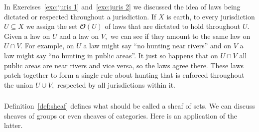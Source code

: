 \documentclass[../main/CT4S-EN-RU]{subfiles}
\begin{document}
\begin{applicationRUS}
\end{applicationRUS}

\begin{exampleENG}
In Exercises~\ref{exc:juris 1} and~\ref{exc:juris 2} we discussed the idea of laws being dictated or respected throughout a jurisdiction. If $X$ is earth, to every jurisdiction $U\subseteq X$ we assign the set ${𝓞}(U)$ of laws that are dictated to hold throughout $U.$ Given a law on $U$ and a law on $V,$ we can see if they amount to the same law on $U\cap V.$ For example, on $U$ a law  might say “no hunting near rivers” and on $V$ a law might say “no hunting in public areas”. It just so happens that on $U\cap V$ all public areas are near rivers and vice versa, so the laws agree there. These laws patch together to form a single rule about hunting that is enforced throughout the union $U\cup V,$ respected by all jurisdictions within it.
\end{exampleENG}

\begin{exampleRUS}
\end{exampleRUS}


\subsubsection{}

\begin{blockENG}
Definition~\ref{def:sheaf} defines what should be called a sheaf of sets. We can discuss sheaves of groups or even sheaves of categories. Here is an application of the latter.
\end{blockENG}

\begin{blockRUS}
\end{blockRUS}
\end{document}
